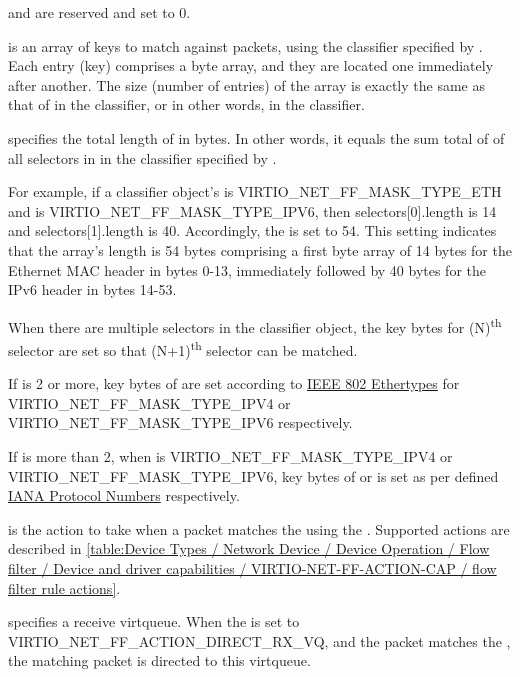  and  are reserved and set to 0.

 is an array of keys to match against packets, using
the classifier specified by . Each entry (key) comprises
a byte array, and they are located one immediately after another.
The size (number of entries) of the array is exactly the same as that of
 in the classifier, or in other words, 
in the classifier.

 specifies the total length of  in bytes.
In other words, it equals the sum total of  of all
selectors in  in the classifier specified by
.

For example, if a classifier object's  is
VIRTIO_NET_FF_MASK_TYPE_ETH and  is
VIRTIO_NET_FF_MASK_TYPE_IPV6,
then selectors[0].length is 14 and selectors[1].length is 40.
Accordingly, the  is set to 54.
This setting indicates that the  array's length is 54 bytes
comprising a first byte array of 14 bytes for the
Ethernet MAC header in bytes 0-13, immediately followed by 40 bytes for the
IPv6 header in bytes 14-53.

When there are multiple selectors in the classifier object, the key bytes
for (N)\textsuperscript{th} selector are set so that
(N+1)\textsuperscript{th} selector can be matched.

If  is 2 or more, key bytes of 
are set according to \hyperref[intro:IEEE 802 Ethertypes]{IEEE 802 Ethertypes}
for VIRTIO_NET_FF_MASK_TYPE_IPV4 or VIRTIO_NET_FF_MASK_TYPE_IPV6 respectively.

If  is more than 2, when  is
VIRTIO_NET_FF_MASK_TYPE_IPV4 or VIRTIO_NET_FF_MASK_TYPE_IPV6, key
bytes of  or  is set as per
 defined \hyperref[intro:IANA Protocol Numbers]{IANA Protocol Numbers}
respectively.

 is the action to take when a packet matches the
 using the . Supported actions are described in
\ref{table:Device Types / Network Device / Device Operation / Flow filter / Device and driver capabilities / VIRTIO-NET-FF-ACTION-CAP / flow filter rule actions}.

 specifies a receive virtqueue. When the  is set
to VIRTIO_NET_FF_ACTION_DIRECT_RX_VQ, and the packet matches the ,
the matching packet is directed to this virtqueue.

